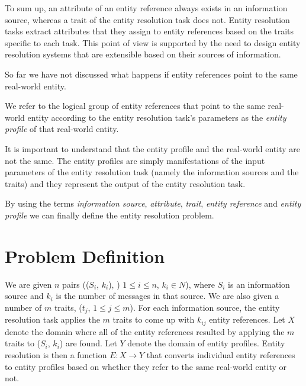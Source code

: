 \documentclass[11pt]{article}
\begin{document}
    To sum up, an attribute of an entity reference always exists in an
    information source, whereas a trait of the entity resolution task does not.
    Entity resolution tasks extract attributes that they assign to entity
    references based on the traits specific to each task.
    This point of view is supported by the need to design entity resolution
    systems that are extensible based on their sources of
    information\cite{fever2009}\cite{magellan2020}\cite{oyster2012}.

    So far we have not discussed what happens if entity references point to the
    same real-world entity.
    
    \begin{defn}
        We refer to the logical group of entity references that point to
        the same real-world entity according to the entity resolution task's
        parameters as the \textit{entity profile} of that real-world entity.
    \end{defn}

    It is important to understand that the entity profile and the real-world
    entity are not the same.
    The entity profiles are simply manifestations of the input parameters of the
    entity resolution task (namely the information sources and the traits) and
    they represent the output of the entity resolution task.
    
    By using the terms \textit{information source}, \textit{attribute},
    \textit{trait}, \textit{entity reference} and \textit{entity profile} we can
    finally define the entity resolution problem.

    \section{Problem Definition}\label{sec:problem}

    We are given $n$ pairs (($S_i$, $k_i$), ) $1 \leq i \leq n$, $k_i \in N$), 
    where $S_i$ is an information source and $k_i$ is
    the number of messages in that source.
    We are also given a number of $m$ traits, ($t_j$, $1 \leq j \leq m$).
    For each information source, the entity resolution task applies the $m$ traits
    to come up with $k_{ij}$ entity references.
    Let $X$ denote the domain where all of the entity references resulted by
    applying the $m$ traits to ($S_i$, $k_i$) are found.
    Let $Y$ denote the domain of entity profiles.
    Entity resolution is then a function $E: X 	\rightarrow Y$ that converts individual
    entity references to entity profiles based on whether they refer to the
    same real-world entity or not.
\end{document}
